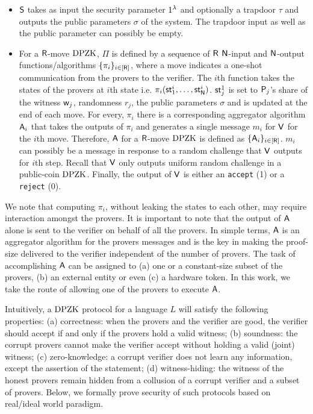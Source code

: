 \begin{itemize}
\item $\mathsf{S}$ takes as input the security parameter $1^{\lambda}$ and optionally a trapdoor $\tau$ and outputs the public parameters $\sigma$ of the system. The trapdoor input as well as the public parameter can possibly be empty.
\item For a $\mathsf{R}$-move $\text{DPZK}$, $\Pi$ is defined by a sequence of $\mathsf{R}$ $\mathsf{N}$-input and $\mathsf{N}$-output functions/algorithms   $\{\pi_i\}_{i \in [\mathsf{R}]}$, where a move indicates a one-shot communication from the provers to the verifier.  The $i$th function takes the states of the provers at $i$th state i.e. $\pi_i(\mathsf{st}^i_1, \ldots, \mathsf{st}^i_{\mathsf{N}})$. $\mathsf{st}^1_j$ is set to  $\mathsf{P}_j$'s share of the witness $\mathsf{w}_j$, randomness $r_j$, the public parameters $\sigma$ and is updated at the end of each move.  For every, $\pi_i$ there is a corresponding aggregator algorithm $\mathsf{A}_i$ that takes the outputs of $\pi_i$ and generates a single message  $m_i$ for $\mathsf{V}$ for the $i$th move. Therefore, $\mathsf{A}$ for a $\mathsf{R}$-move $\text{DPZK}$ is defined as $\{\mathsf{A}_i\}_{i \in [\mathsf{R}]}$.  $m_i$ can possibly be  a message in response to a random challenge that $\mathsf{V}$ outputs for $i$th step. Recall that $\mathsf{V}$ only outputs uniform random challenge in a public-coin $\text{DPZK}$. Finally, the output of $\mathsf{V}$ is either an {\tt accept} (1) or a {\tt reject} (0).%
\end{itemize}
We note that computing $\pi_i$, without leaking the states to each other, may require interaction amongst the provers. It is important to note that the output of $\mathsf{A}$ alone is sent to the verifier on behalf of all the provers. In simple terms,  $\mathsf{A}$ is an aggregator algorithm for the provers messages and is the key in making the proof-size delivered to the verifier independent of the number of provers.  The task of accomplishing $\mathsf{A}$ can be assigned to (a) one or a constant-size subset of the provers, (b) an external entity or even (c) a hardware token.  In this work, we take the route of allowing one of the provers to execute $\mathsf{A}$.

Intuitively, a $\text{DPZK}$ protocol for a language $L$ will satisfy the following properties: (a)  correctness:  when the provers and the verifier are good, the verifier should accept if and only if the provers hold a valid witness; (b) soundness:  the corrupt provers cannot make the verifier accept without holding a valid (joint) witness; (c) zero-knowledge: a corrupt verifier does not learn any information, except  the assertion of the statement; (d)  witness-hiding: the witness of the honest provers remain hidden from a collusion of a corrupt verifier and a subset of provers. Below, we formally prove security of such protocols based on real/ideal world paradigm. 

